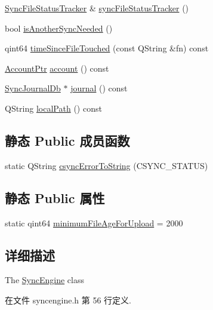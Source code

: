 \begin{DoxyCompactItemize}
\hyperlink{class_o_c_c_1_1_sync_file_status_tracker}{Sync\+File\+Status\+Tracker} \& \hyperlink{class_o_c_c_1_1_sync_engine_aa58939a62b5443a4453215d2d19e7697}{sync\+File\+Status\+Tracker} ()
\item 
bool \hyperlink{class_o_c_c_1_1_sync_engine_adf2929716b65d316140a55f8565b4c22}{is\+Another\+Sync\+Needed} ()
\item 
qint64 \hyperlink{class_o_c_c_1_1_sync_engine_a3d59622465048c8f2ddb5650ae920c75}{time\+Since\+File\+Touched} (const Q\+String \&fn) const
\item 
\hyperlink{namespace_o_c_c_a848616aedb9188e223c6b9867757fe69}{Account\+Ptr} \hyperlink{class_o_c_c_1_1_sync_engine_acf2809ef8a773ce4b3c16faf4f4a250e}{account} () const
\item 
\hyperlink{class_o_c_c_1_1_sync_journal_db}{Sync\+Journal\+Db} $\ast$ \hyperlink{class_o_c_c_1_1_sync_engine_af598f7fc3361738ca90890d277708b3c}{journal} () const
\item 
Q\+String \hyperlink{class_o_c_c_1_1_sync_engine_acc63fae6a51d4321a46365477d8f657f}{local\+Path} () const
\end{DoxyCompactItemize}
\subsection*{静态 Public 成员函数}
\begin{DoxyCompactItemize}
\item 
static Q\+String \hyperlink{class_o_c_c_1_1_sync_engine_a4924be69b9fb674d6f885a842d47d750}{csync\+Error\+To\+String} (C\+S\+Y\+N\+C\+\_\+\+S\+T\+A\+T\+US)
\end{DoxyCompactItemize}
\subsection*{静态 Public 属性}
\begin{DoxyCompactItemize}
\item 
static qint64 \hyperlink{class_o_c_c_1_1_sync_engine_a2cf8c1163d96451a9f48fc0b75f37728}{minimum\+File\+Age\+For\+Upload} = 2000
\end{DoxyCompactItemize}


\subsection{详细描述}
The \hyperlink{class_o_c_c_1_1_sync_engine}{Sync\+Engine} class 

在文件 syncengine.\+h 第 56 行定义.




